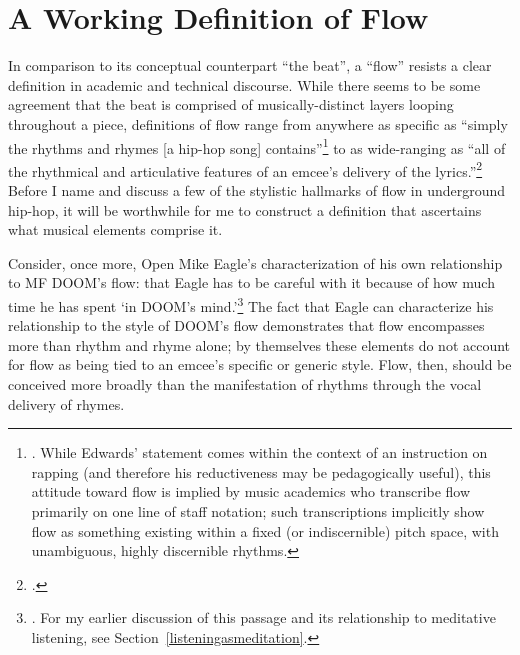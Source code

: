 \onehalfspacing
\section{A Working Definition of Flow}
In comparison to its conceptual counterpart ``the beat'', a ``flow'' resists a clear definition in
academic and technical discourse. While there seems to be some agreement that the beat is comprised
of musically-distinct layers looping throughout a piece, definitions of flow range from anywhere as
specific as ``simply the rhythms and rhymes [a hip-hop song] contains''\footnote{
    \autocite[63]{pauledwardsHowRapArt2009}. While Edwards' statement comes within the context of an
    instruction on rapping (and therefore his reductiveness may be pedagogically useful), this attitude
    toward flow is implied by music academics who transcribe flow primarily on one line of staff notation;
    such transcriptions implicitly show flow as something existing within a fixed (or indiscernible) pitch
    space, with unambiguous, highly discernible rhythms.} 
to as wide-ranging as ``all of the rhythmical and articulative features of an emcee's delivery of 
the lyrics.''\footnote{
    \cite{kyleadamsMetricalTechniquesFlow2009}.} 
Before I name and discuss a few of the stylistic hallmarks of flow in underground hip-hop, it will be
worthwhile for me to construct a definition that ascertains what musical elements comprise it.

Consider, once more, Open Mike Eagle's characterization of his own relationship to MF DOOM's flow:
that Eagle has to be careful with it because of how much time he has spent `in DOOM's mind.'\footnote{
    \cite{estellecaswellRappingDeconstructedBest2016}. For my earlier discussion of this passage and its
    relationship to meditative listening, see Section~\ref{listeningasmeditation}.} 
The fact that Eagle can characterize his relationship to the style of DOOM's flow demonstrates that
flow encompasses more than rhythm and rhyme alone; by themselves these elements do not account for flow
as being tied to an emcee's specific or generic style. Flow, then, should be conceived more broadly than
the manifestation of rhythms through the vocal delivery of rhymes.

